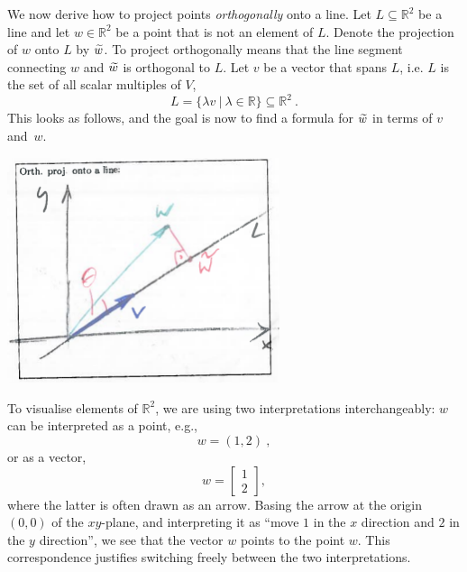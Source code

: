 \begin{application}
	We now derive how to project points \emph{orthogonally} onto a line. Let $L\subseteq\mathbb{R}^2$ be a line and let $w\in\mathbb{R}^2$ be a point that is not an element of $L$. Denote the projection of $w$ onto $L$ by $\widetilde{w}$. To project orthogonally means that the line segment connecting $w$ and $\widetilde{w}$ is orthogonal to $L$. Let $v$ be a vector that spans $L$, i.e. $L$ is the set of all scalar multiples of $V$,
	\[ L = \{ \lambda v \: | \: \lambda \in \mathbb{R} \} \subseteq \mathbb{R}^2 \:. \]
	This looks as follows, and the goal is now to find a formula for $\widetilde{w}$ in terms of $v$ and~$w$.
	\begin{center}
		\includegraphics[width=0.6\textwidth]{./Figures/f202.png}
	\end{center}
	
	To visualise elements of $\mathbb{R}^2$, we are using two interpretations interchangeably: $w$ can be interpreted as a point, e.g.,
	\[ w = (1,2) \:, \]
	or as a vector,
	\[ w = \begin{bmatrix} 1 \\ 2 \end{bmatrix}, \]
	where the latter is often drawn as an arrow. Basing the arrow at the origin $(0,0)$ of the $xy$-plane, and interpreting it as ``move $1$ in the $x$ direction and $2$ in the $y$ direction'', we see that the vector $w$ points to the point $w$. This correspondence justifies switching freely between the two interpretations.
	

\end{application}
